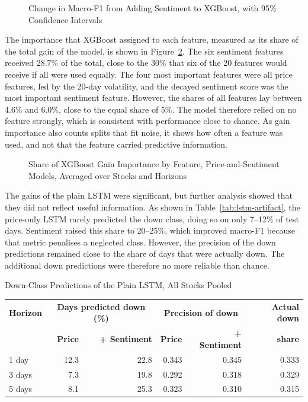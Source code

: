 \begin{figure}[htbp]
\centering
{}
\caption{Change in Macro-F1 from Adding Sentiment to XGBoost, with 95\% Confidence Intervals}
\label{fig:ablation-xgb}
\end{figure}

The importance that XGBoost assigned to each feature, measured as its share of the total gain of the model, is shown in Figure~\ref{fig:importance}. The six sentiment features received 28.7\% of the total, close to the 30\% that six of the 20 features would receive if all were used equally. The four most important features were all price features, led by the 20-day volatility, and the decayed sentiment score was the most important sentiment feature. However, the shares of all features lay between 4.6\% and 6.0\%, close to the equal share of 5\%. The model therefore relied on no feature strongly, which is consistent with performance close to chance. As gain importance also counts splits that fit noise, it shows how often a feature was used, and not that the feature carried predictive information.

\begin{figure}[htbp]
\centering
{}
\caption{Share of XGBoost Gain Importance by Feature, Price-and-Sentiment Models, Averaged over Stocks and Horizons}
\label{fig:importance}
\end{figure}

The gains of the plain LSTM were significant, but further analysis showed that they did not reflect useful information. As shown in Table~\ref{tab:lstm-artifact}, the price-only LSTM rarely predicted the down class, doing so on only 7--12\% of test days. Sentiment raised this share to 20--25\%, which improved macro-F1 because that metric penalises a neglected class. However, the precision of the down predictions remained close to the share of days that were actually down. The additional down predictions were therefore no more reliable than chance.

\begin{utptable}{Down-Class Predictions of the Plain LSTM, All Stocks Pooled}
\label{tab:lstm-artifact}
\begin{tabular}{@{}lrrrrr@{}}
\toprule
\textbf{Horizon} & \multicolumn{2}{c}{\textbf{Days predicted down (\%)}} & \multicolumn{2}{c}{\textbf{Precision of down}} & \textbf{Actual down} \\
 & \textbf{Price} & \textbf{+ Sentiment} & \textbf{Price} & \textbf{+ Sentiment} & \textbf{share} \\
\midrule
1 day & 12.3 & 22.8 & 0.343 & 0.345 & 0.333 \\
3 days & 7.3 & 19.8 & 0.292 & 0.318 & 0.329 \\
5 days & 8.1 & 25.3 & 0.323 & 0.310 & 0.315 \\
\bottomrule
\end{tabular}
\end{utptable}

